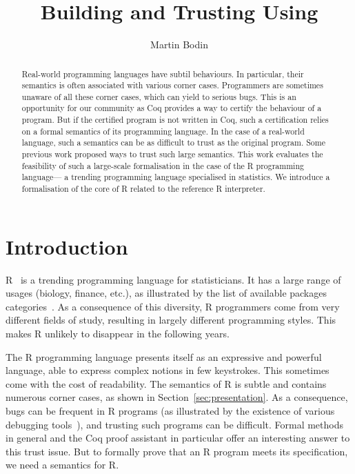 \documentclass[9pt, sigplan, natbib=false, screen=true]{acmart}
\title{Building and Trusting \R{} Using \Coq{}}
\author{Martin Bodin}
\affiliation{
    \institution{Center of Mathematical Modeling}
    \streetaddress{Beauchef 851}
    \city{Santiago}
    \country{Chile}
}
\newcommand\Coq{Coq}
\newcommand\R{R}
\begin{document}
\begin{abstract}
Real-world programming languages have subtil behaviours.
In particular, their semantics is often associated with
various corner cases.
Programmers are sometimes unaware of all these corner cases,
which can yield to serious bugs.
This is an opportunity for our community
as \Coq{} provides a way to certify the behaviour of a program.
But if the certified program is not written in \Coq{},
such a certification relies on a formal semantics of its programming language.
In the case of a real-world language, such a semantics
can be as difficult to trust as the original program.
Some previous work proposed ways to trust such large semantics.
This work evaluates the feasibility of such a large-scale formalisation
in the case of the \R{} programming language---%
a trending programming language specialised in statistics.
We introduce a formalisation of the core of \R{}
related to the reference \R{} interpreter.
\end{abstract}

\maketitle

\section{Introduction}
\label{sec:introduction}

\R{}~\parencite{ihaka1996r, Rwebsite} is a trending
programming language for statisticians.
It has a large range of usages (biology, finance, etc.),
as illustrated by the list of available packages categories~\parencite{rviews}.
As a consequence of this diversity,
\R{} programmers come from very different fields of study,
resulting in largely different programming styles.
This makes \R{} unlikely to disappear
in the following years.

The \R{} programming language presents itself
as an expressive and powerful language,
able to express complex notions in few keystrokes.
This sometimes come with the cost of readability.
The semantics of \R{} is subtle
and contains numerous corner cases,
as shown in Section~\ref{sec:presentation}.
%
As a consequence, bugs can be frequent in \R{} programs
(as illustrated by the existence of various debugging tools~\parencite{mcpherson2014}),
and trusting such programs can be difficult.
Formal methods in general and the \Coq{} proof assistant in particular
offer an interesting answer to this trust issue.
But to formally prove that an \R{} program meets its specification,
we need a semantics for \R{}.
\end{document}

